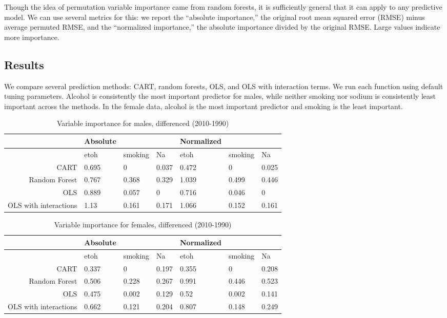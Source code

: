 \documentclass[11pt]{article}\usepackage[]{graphicx}\usepackage[]{color}
\begin{document}
Though the idea of permutation variable importance came from random forests, it is sufficiently general that it can apply to any predictive model. 
We can use several metrics for this: 
we report the ``absolute importance,'' the original root mean squared error (RMSE) minus average permuted RMSE, and the ``normalized importance,'' the absolute importance divided by the original RMSE. 
Large values indicate more importance.

\subsection{Results}
We compare several prediction methods: CART, random forests, OLS, and OLS with interaction terms.
We run each function using default tuning parameters.
Alcohol is consistently the most important predictor for males, while
neither smoking nor sodium is consistently least important across the methods. 
In the female data, alcohol is the most important predictor and smoking is the least important.




 
\begin{table}[ht]
\centering
\begin{tabular}{r|lll|lll}
   \hline
 & Absolute &  &  & Normalized &  &  \\ 
   \hline
   & etoh & smoking & Na & etoh & smoking & Na \\ 
   \hline
CART & 0.695 & 0 & 0.037 & 0.472 & 0 & 0.025 \\ 
  Random Forest & 0.767 & 0.368 & 0.329 & 1.039 & 0.499 & 0.446 \\ 
  OLS & 0.889 & 0.057 & 0 & 0.716 & 0.046 & 0 \\ 
  OLS with interactions & 1.13 & 0.161 & 0.171 & 1.066 & 0.152 & 0.161 \\ 
   \hline
\end{tabular}
\caption{Variable importance for males, differenced (2010-1990)} 
\end{table}
\begin{table}[ht]
\centering
\begin{tabular}{r|lll|lll}
   \hline
 & Absolute &  &  & Normalized &  &  \\ 
   \hline
   & etoh & smoking & Na & etoh & smoking & Na \\ 
   \hline
CART & 0.337 & 0 & 0.197 & 0.355 & 0 & 0.208 \\ 
  Random Forest & 0.506 & 0.228 & 0.267 & 0.991 & 0.446 & 0.523 \\ 
  OLS & 0.475 & 0.002 & 0.129 & 0.52 & 0.002 & 0.141 \\ 
  OLS with interactions & 0.662 & 0.121 & 0.204 & 0.807 & 0.148 & 0.249 \\ 
   \hline
\end{tabular}
\caption{Variable importance for females, differenced (2010-1990)} 
\end{table}
\end{document}
